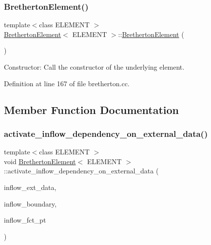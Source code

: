 \subsubsection{\texorpdfstring{Bretherton\+Element()}{BrethertonElement()}}
{\footnotesize\ttfamily template$<$class E\+L\+E\+M\+E\+NT $>$ \\
\hyperlink{classBrethertonElement}{Bretherton\+Element}$<$ E\+L\+E\+M\+E\+NT $>$\+::\hyperlink{classBrethertonElement}{Bretherton\+Element} (\begin{DoxyParamCaption}{ }\end{DoxyParamCaption})\hspace{0.3cm}{\ttfamily [inline]}}



Constructor\+: Call the constructor of the underlying element. 



Definition at line 167 of file bretherton.\+cc.



\subsection{Member Function Documentation}
\mbox{\label{classBrethertonElement_aa526749ab70cd15ee05c1b58b5f135a6}} 
\subsubsection{\texorpdfstring{activate\+\_\+inflow\+\_\+dependency\+\_\+on\+\_\+external\+\_\+data()}{activate\_inflow\_dependency\_on\_external\_data()}}
{\footnotesize\ttfamily template$<$class E\+L\+E\+M\+E\+NT $>$ \\
void \hyperlink{classBrethertonElement}{Bretherton\+Element}$<$ E\+L\+E\+M\+E\+NT $>$\+::activate\+\_\+inflow\+\_\+dependency\+\_\+on\+\_\+external\+\_\+data (\begin{DoxyParamCaption}\item[{const Vector$<$ Data $\ast$$>$ \&}]{inflow\+\_\+ext\+\_\+data,  }\item[{const unsigned \&}]{inflow\+\_\+boundary,  }\item[{\hyperlink{classBrethertonElement_a313d868ce6fbd8df07b0360db25133ce}{Inflow\+Fct\+Pt}}]{inflow\+\_\+fct\+\_\+pt }\end{DoxyParamCaption})\hspace{0.3cm}{\ttfamily [inline]}}



